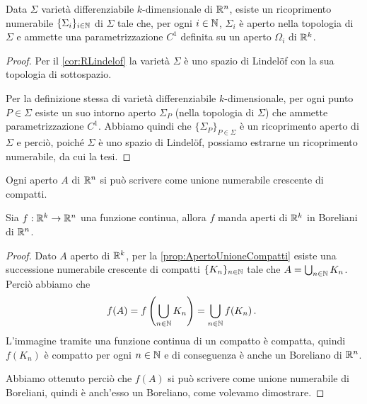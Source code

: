 
\begin{lemma}\label{lemma:SottovarietaUnioneNumerabile}
	Data $\Sigma$ varietà differenziabile $k$-dimensionale di $\mathbb R^n$, esiste un ricoprimento numerabile  $\{\Sigma_i\}_{i\in\mathbb N}$ di $\Sigma$ tale che, per ogni $i\in\mathbb N$, $\Sigma_i$ è aperto nella topologia di $\Sigma$ e ammette una parametrizzazione $C^1$ definita su un aperto $\Omega_i$ di $\mathbb R^k$.
\end{lemma}
\begin{proof}
	Per il \cref{cor:RLindelof} la varietà $\Sigma$ è uno spazio di Lindelöf con la sua topologia di sottospazio.
	
	Per la definizione stessa di varietà differenziabile $k$-dimensionale, per ogni punto $P\in\Sigma$ esiste un suo intorno aperto $\Sigma_P$ (nella topologia di $\Sigma$) che ammette parametrizzazione $C^1$. Abbiamo quindi che $\{\Sigma_P\}_{P\in\Sigma}$ è un ricoprimento aperto di $\Sigma$ e perciò, poiché $\Sigma$ è uno spazio di Lindelöf, possiamo estrarne un ricoprimento numerabile, da cui la tesi.
\end{proof}

\begin{proposition}\label{prop:ApertoUnioneCompatti}
	Ogni aperto $A$ di $\mathbb R^n$ si può scrivere come unione numerabile crescente di compatti.
\end{proposition}

\begin{lemma}\label{lemma:ImmagineApertiContinua}
	Sia $f:\mathbb R^k\to\mathbb R^n$ una funzione continua, allora $f$ manda aperti di $\mathbb R^k$ in Boreliani di $\mathbb R^n$.
\end{lemma}
\begin{proof}
	Dato $A$ aperto di $\mathbb R^k$, per la \cref{prop:ApertoUnioneCompatti} esiste una successione numerabile crescente di compatti $\{K_n\}_{n\in\mathbb N}$ tale che $A=\bigcup_{n\in\mathbb N}K_n$. Perciò abbiamo che
	\begin{equation*}
		f(A)=f\left(\bigcup_{n\in\mathbb N}K_n\right)=\bigcup_{n\in\mathbb N}f(K_n)\, \text{. }
	\end{equation*}
	L'immagine tramite una funzione continua di un compatto è compatta, quindi $f(K_n)$ è compatto per ogni $n\in\mathbb N$ e di conseguenza è anche un Boreliano di $\mathbb R^n$.
	
	Abbiamo ottenuto perciò che $f(A)$ si può scrivere come unione numerabile di Boreliani, quindi è anch'esso un Boreliano, come volevamo dimostrare.	
\end{proof}

